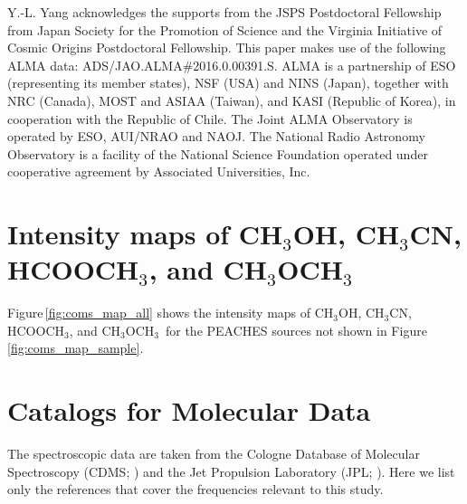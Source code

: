 \documentclass[twocolumn]{aastex62}
\newcommand{\methylformate}{\mbox{HCOOCH$_{3}$}}
\newcommand{\methanol}{\mbox{CH$_{3}$OH}}
\newcommand{\dimethylether}{\mbox{CH$_{3}$OCH$_{3}$}}
\newcommand{\methylcyanide}{\mbox{CH$_{3}$CN}}
\begin{document}
\acknowledgements
Y.-L. Yang acknowledges the supports from the JSPS Postdoctoral Fellowship from Japan Society for the Promotion of Science and the Virginia Initiative of Cosmic Origins Postdoctoral Fellowship.  This paper makes use of the following ALMA data: ADS/JAO.ALMA\#2016.0.00391.S. ALMA is a partnership of ESO (representing its member states), NSF (USA) and NINS (Japan), together with NRC (Canada), MOST and ASIAA (Taiwan), and KASI (Republic of Korea), in cooperation with the Republic of Chile. The Joint ALMA Observatory is operated by ESO, AUI/NRAO and NAOJ.  The National Radio Astronomy Observatory is a facility of the National Science Foundation operated under cooperative agreement by Associated Universities, Inc.



\appendix
\section{Intensity maps of \methanol, \methylcyanide, \methylformate, and \dimethylether}
Figure\,\ref{fig:coms_map_all} shows the intensity maps of \methanol, \methylcyanide, \methylformate, and \dimethylether\ for the PEACHES sources not shown in Figure\,\ref{fig:coms_map_sample}.
\label{sec:coms_maps}


\section{Catalogs for Molecular Data}
\label{sec:catalogs}
The spectroscopic data are taken from the Cologne Database of Molecular Spectroscopy (CDMS; \citealt{2001AA...370L..49M,2005JMoSt.742..215M,2016JMoSp.327...95E}) and the Jet Propulsion Laboratory (JPL; \citealt{1998JQSRT..60..883P}).  Here we list only the references that cover the frequencies relevant to this study.  
\end{document}
